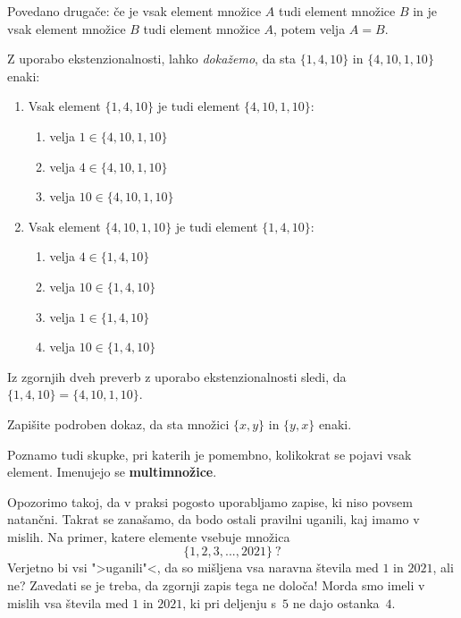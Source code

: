 Povedano drugače: če je vsak element množice $A$ tudi element množice $B$ in je vsak element množice $B$ tudi element množice $A$, potem velja $A = B$.

Z uporabo ekstenzionalnosti, lahko \emph{dokažemo}, da sta $\{1, 4, 10\}$ in $\{4, 10, 1, 10\}$ enaki:
%
\begin{enumerate}
\item 
  Vsak element $\{1, 4, 10\}$ je tudi element $\{4, 10, 1, 10\}$:
  \begin{enumerate}
    \item velja $1 \in \{4, 10, 1, 10\}$
    \item velja $4 \in \{4, 10, 1, 10\}$
    \item velja $10 \in \{4, 10, 1, 10\}$
  \end{enumerate}
\item
Vsak element $\{4, 10, 1, 10\}$ je tudi element $\{1, 4, 10\}$:
  \begin{enumerate}
     \item velja $4 \in \{1, 4, 10\}$
     \item velja $10 \in \{1, 4, 10\}$
     \item velja $1 \in \{1, 4, 10\}$
     \item velja $10 \in \{1, 4, 10\}$
  \end{enumerate}
\end{enumerate}

Iz zgornjih dveh preverb z uporabo ekstenzionalnosti sledi, da $\{1, 4, 10\} = \{4, 10, 1, 10\}$.

\begin{naloga}
  Zapišite podroben dokaz, da sta množici $\{x, y\}$ in $\{y, x\}$ enaki.
\end{naloga}

\begin{opomba}
  Poznamo tudi skupke, pri katerih je pomembno, kolikokrat se pojavi vsak element. Imenujejo se \textbf{multimnožice}.
\end{opomba}

Opozorimo takoj, da v praksi pogosto uporabljamo zapise, ki niso povsem natančni. Takrat se zanašamo, da bodo ostali pravilni uganili, kaj imamo v mislih. Na primer, katere elemente vsebuje množica
%
\begin{equation*}
    \{1, 2, 3, ..., 2021\} \ ?
\end{equation*}
%
Verjetno bi vsi ">uganili"<, da so mišljena vsa naravna števila med $1$ in $2021$, ali ne? Zavedati se je treba, da zgornji zapis tega ne določa! Morda smo imeli v mislih vsa števila med $1$ in $2021$, ki pri deljenju s~$5$ ne dajo ostanka~$4$.

